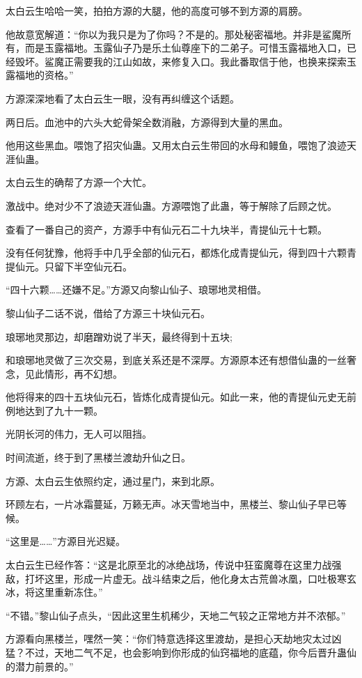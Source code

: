 \begin{this_body}
太白云生哈哈一笑，拍拍方源的大腿，他的高度可够不到方源的肩膀。

他故意宽解道：“你以为我只是为了你吗？不是的。那处秘密福地。并非是鲨魔所有，而是玉露福地。玉露仙子乃是乐土仙尊座下的二弟子。可惜玉露福地入口，已经毁坏。鲨魔正需要我的江山如故，来修复入口。我此番取信于他，也换来探索玉露福地的资格。”

方源深深地看了太白云生一眼，没有再纠缠这个话题。

两日后。血池中的六头大蛇骨架全数消融，方源得到大量的黑血。

他用这些黑血。喂饱了招灾仙蛊。又用太白云生带回的水母和鳗鱼，喂饱了浪迹天涯仙蛊。

太白云生的确帮了方源一个大忙。

激战中。绝对少不了浪迹天涯仙蛊。方源喂饱了此蛊，等于解除了后顾之忧。

查看了一番自己的资产，方源手中有仙元石二十九块半，青提仙元十七颗。

没有任何犹豫，他将手中几乎全部的仙元石，都炼化成青提仙元，得到四十六颗青提仙元。只留下半空仙元石。

“四十六颗……还嫌不足。”方源又向黎山仙子、琅琊地灵相借。

黎山仙子二话不说，借给了方源三十块仙元石。

琅琊地灵那边，却磨蹭劝说了半天，最终得到十五块;

和琅琊地灵做了三次交易，到底关系还是不深厚。方源原本还有想借仙蛊的一丝奢念，见此情形，再不幻想。

他将得来的四十五块仙元石，皆炼化成青提仙元。如此一来，他的青提仙元史无前例地达到了九十一颗。

光阴长河的伟力，无人可以阻挡。

时间流逝，终于到了黑楼兰渡劫升仙之日。

方源、太白云生依照约定，通过星门，来到北原。

环顾左右，一片冰霜蔓延，万籁无声。冰天雪地当中，黑楼兰、黎山仙子早已等候。

“这里是……”方源目光迟疑。

太白云生已经作答：“这是北原至北的冰绝战场，传说中狂蛮魔尊在这里力战强敌，打坏这里，形成一片虚无。战斗结束之后，他化身太古荒兽冰凰，口吐极寒玄冰，将这里重新冻住。”

“不错。”黎山仙子点头，“因此这里生机稀少，天地二气较之正常地方并不浓郁。”

方源看向黑楼兰，嘿然一笑：“你们特意选择这里渡劫，是担心天劫地灾太过凶猛？不过，天地二气不足，也会影响到你形成的仙窍福地的底蕴，你今后晋升蛊仙的潜力前景的。”


\end{this_body}
